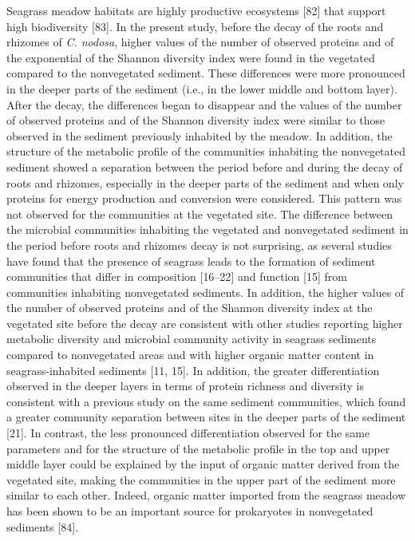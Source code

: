\documentclass[
  12 pt,
]{article}
\begin{document}
Seagrass meadow habitats are highly productive ecosystems {[}82{]} that support high biodiversity {[}83{]}. In the present study, before the decay of the roots and rhizomes of \emph{C. nodosa}, higher values of the number of observed proteins and of the exponential of the Shannon diversity index were found in the vegetated compared to the nonvegetated sediment. These differences were more pronounced in the deeper parts of the sediment (i.e., in the lower middle and bottom layer). After the decay, the differences began to disappear and the values of the number of observed proteins and of the Shannon diversity index were similar to those observed in the sediment previously inhabited by the meadow. In addition, the structure of the metabolic profile of the communities inhabiting the nonvegetated sediment showed a separation between the period before and during the decay of roots and rhizomes, especially in the deeper parts of the sediment and when only proteins for energy production and conversion were considered. This pattern was not observed for the communities at the vegetated site. The difference between the microbial communities inhabiting the vegetated and nonvegetated sediment in the period before roots and rhizomes decay is not surprising, as several studies have found that the presence of seagrass leads to the formation of sediment communities that differ in composition {[}16--22{]} and function {[}15{]} from communities inhabiting nonvegetated sediments. In addition, the higher values of the number of observed proteins and of the Shannon diversity index at the vegetated site before the decay are consistent with other studies reporting higher metabolic diversity and microbial community activity in seagrass sediments compared to nonvegetated areas and with higher organic matter content in seagrass-inhabited sediments {[}11, 15{]}. In addition, the greater differentiation observed in the deeper layers in terms of protein richness and diversity is consistent with a previous study on the same sediment communities, which found a greater community separation between sites in the deeper parts of the sediment {[}21{]}. In contrast, the less pronounced differentiation observed for the same parameters and for the structure of the metabolic profile in the top and upper middle layer could be explained by the input of organic matter derived from the vegetated site, making the communities in the upper part of the sediment more similar to each other. Indeed, organic matter imported from the seagrass meadow has been shown to be an important source for prokaryotes in nonvegetated sediments {[}84{]}.
\end{document}
